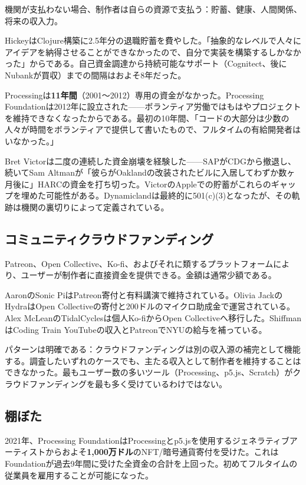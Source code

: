 \documentclass[10pt,letterpaper,twocolumn]{article}
\begin{document}
機関が支払わない場合、制作者は自らの資源で支払う：貯蓄、健康、人間関係、将来の収入力。

HickeyはClojure構築に2.5年分の退職貯蓄を費やした。「抽象的なレベルで人々にアイデアを納得させることができなかったので、自分で実装を構築するしかなかった」からである。自己資金調達から持続可能なサポート（Cognitect、後にNubankが買収）までの間隔はおよそ8年だった。

Processingは\textbf{11年間}（2001〜2012）専用の資金がなかった。Processing Foundationは2012年に設立された——ボランティア労働ではもはやプロジェクトを維持できなくなったからである。最初の10年間、「コードの大部分は少数の人々が時間をボランティアで提供して書いたもので、フルタイムの有給開発者はいなかった。」

Bret Victorは二度の連続した資金崩壊を経験した——SAPがCDGから撤退し、続いてSam Altmanが「彼らがOaklandの改装されたビルに入居してわずか数ヶ月後に」HARCの資金を打ち切った。VictorのAppleでの貯蓄がこれらのギャップを埋めた可能性がある。Dynamiclandは最終的に501(c)(3)となったが、その軌跡は機関の裏切りによって定義されている。

\subsection{コミュニティクラウドファンディング}

Patreon、Open Collective、Ko-fi、およびそれに類するプラットフォームにより、ユーザーが制作者に直接資金を提供できる。金額は通常少額である。

AaronのSonic PiはPatreon寄付と有料講演で維持されている。Olivia JackのHydraはOpen Collectiveの寄付と200ドルのマイクロ助成金で運営されている。Alex McLeanのTidalCyclesは個人Ko-fiからOpen Collectiveへ移行した。ShiffmanはCoding Train YouTubeの収入とPatreonでNYUの給与を補っている。

パターンは明確である：クラウドファンディングは別の収入源の補完として機能する。調査したいずれのケースでも、主たる収入として制作者を維持することはできなかった。最もユーザー数の多いツール（Processing、p5.js、Scratch）がクラウドファンディングを最も多く受けているわけではない。

\subsection{棚ぼた}

2021年、Processing FoundationはProcessingとp5.jsを使用するジェネラティブアーティストからおよそ\textbf{1,000万ドル}のNFT/暗号通貨寄付を受けた。これはFoundationが過去9年間に受けた全資金の合計を上回った。初めてフルタイムの従業員を雇用することが可能になった。
\end{document}
